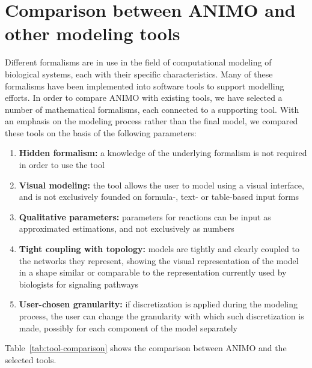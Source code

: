 \section{Comparison between ANIMO and other modeling tools}\label{suppl:comparison-table}
Different formalisms are in use in the field of computational
modeling of biological systems, each with their specific characteristics.
Many of these formalisms have been implemented into
software tools to support modelling efforts. In order to compare
ANIMO with existing tools, we have selected a number of mathematical formalisms,
each connected to a supporting tool. With an emphasis on the modeling
process rather than the final model, we compared these tools on
the basis of the following parameters:

\begin{enumerate}
  \item {\bf Hidden formalism:} a knowledge of the underlying formalism is not required in order to use the tool
  \item {\bf Visual modeling:} the tool allows the user to model using a visual interface, and is not exclusively
      founded on formula-, text- or table-based input forms
  \item {\bf Qualitative parameters:} parameters for reactions can be input as approximated estimations, and not exclusively as numbers
  \item {\bf Tight coupling with topology:} models are tightly and clearly coupled to the networks they represent, showing the visual
      representation of the model in a shape similar or comparable to the representation currently used by biologists
      for signaling pathways
  \item {\bf User-chosen granularity:} if discretization is applied during the modeling process, the user can change the granularity
      with which such discretization is made, possibly for each component of the model separately
\end{enumerate}
Table~\ref{tab:tool-comparison} shows the comparison between ANIMO and the selected tools.

